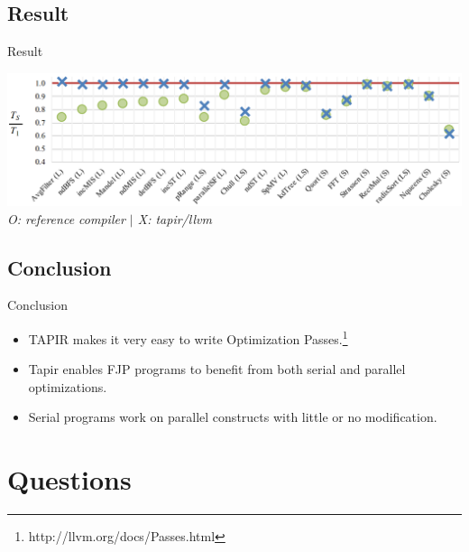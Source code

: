 \documentclass{beamer}
\begin{document}
\subsection{Result}
\begin{frame}{Result}

\centering 
\includegraphics[width=\textwidth]{result}
{ \em O: reference compiler $|$  X: tapir/llvm }


\end{frame}

\subsection{Conclusion}

\begin{frame}{Conclusion}
\begin{itemize}
    \item TAPIR makes it very easy to write \alert{Optimization Passes}.\footnote{http://llvm.org/docs/Passes.html}
    \item Tapir enables FJP programs to benefit from both serial and parallel optimizations.
    \item  Serial programs work on parallel constructs with little or no modification.
\end{itemize}
\end{frame}


\section*{Questions}
\end{document}
